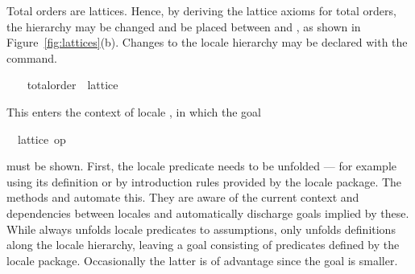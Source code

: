 \begin{isabellebody}
\begin{isamarkuptext}
  Total orders are lattices.  Hence, by deriving the lattice
  axioms for total orders, the hierarchy may be changed
  and  be placed between 
  and , as shown in Figure~\ref{fig:lattices}(b).
  Changes to the locale hierarchy may be declared
  with the  command.%
\end{isamarkuptext}%
\isamarkuptrue%
%
\isadelimvisible
\ \ %
\endisadelimvisible
%
\isatagvisible
{}\isamarkupfalse%
\ total{\isacharunderscore}order\ {\isasymsubseteq}\ lattice%
\begin{isamarkuptxt}%
This enters the context of locale , in
  which the goal \begin{isabelle}%
\ {}{\isachardot}\ lattice\ op\ {\isasymsqsubseteq}%
\end{isabelle} must be shown.  First, the
  locale predicate needs to be unfolded --- for example using its
  definition or by introduction rules
  provided by the locale package.  The methods 
  and  automate this.  They are aware of the
  current context and dependencies between locales and automatically
  discharge goals implied by these.  While 
  always unfolds locale predicates to assumptions,  only unfolds definitions along the locale
  hierarchy, leaving a goal consisting of predicates defined by the
  locale package.  Occasionally the latter is of advantage since the goal
  is smaller.


\end{isamarkuptxt}
\end{isabellebody}
